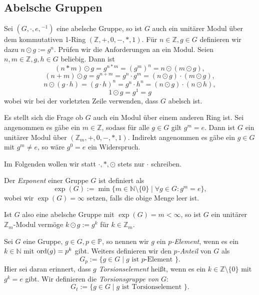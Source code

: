 
\subsection{Abelsche Gruppen}

\begin{remark}
    Sei $(G, \cdot, e, {}^{-1})$ eine abelsche Gruppe, so ist $G$ auch ein unitärer Modul über dem kommutativen 1-Ring $(\mathbb{Z}, +, 0, -, \ast, 1)$. Für $n \in \mathbb{Z}, g \in G$ definieren wir dazu $n \odot g := g^n$. Prüfen wir die Anforderungen an ein Modul. Seien $n, m \in \mathbb{Z}, g, h \in G$ beliebig. Dann ist
    $$ (n \ast m) \odot g = g^{n \ast m} = (g^m)^n = n \odot (m \odot g), $$
    $$ (n+m) \odot g = g^{n+m} = g^n \cdot g^m = (n \odot g) \cdot (m \odot g), $$
    $$ n \odot (g \cdot h) = (g \cdot h)^n = g^n \cdot h^n = (n \odot g) \cdot (n \odot h), $$
    $$1\odot g=g^1=g$$
    wobei wir bei der vorletzten Zeile verwenden, dass $G$ abelsch ist.

    Es stellt sich die Frage ob $G$ auch ein Modul über einem anderen Ring ist. Sei angenommen es gäbe ein $m \in \mathbb{Z}$, sodass für alle $g \in G$ gilt $g^m = e$. Dann ist $G$ ein unitärer Modul über $(\mathbb{Z}_m, +, 0, -, \ast, 1)$. Indirekt angenommen es gäbe ein $g \in G$ mit $g^m \neq e$, so wäre $g^0 = e$ ein Widerspruch.

    Im Folgenden wollen wir statt $\cdot, \ast, \odot$ stets nur $\cdot$ schreiben.
\end{remark}

\begin{definition}
    Der \emph{Exponent} einer Gruppe $G$ ist definiert als
    $$ \exp(G) := \min \{ m \in \mathbb{N} \setminus \{0\} \mid \forall g \in G: g^m = e \}, $$
    wobei wir $\exp(G) = \infty$ setzen, falls die obige Menge leer ist.
\end{definition}

\begin{remark}
    Ist $G$ also eine abelsche Gruppe mit $\exp(G) = m < \infty$, so ist $G$ ein unitärer $\mathbb{Z}_m$-Modul vermöge $k \odot g := g^k$ für $k \in \mathbb{Z}_m$.
\end{remark}

\begin{definition}
    Sei $G$ eine Gruppe, $g \in G, p \in \mathbb{P}$, so nennen wir $g$ ein \emph{$p$-Element}, wenn es ein $k \in \mathbb{N}$ mit $\operatorname{ord}(g) = p^k$ gibt. Weiters definieren wir den \emph{$p$-Anteil} von $G$ als
    $$ G_p := \{ g \in G \mid g \textrm{ ist $p$-Element } \}. $$
    Hier sei daran erinnert, dass $g$ \emph{Torsionselement} heißt, wenn es ein $k \in \mathbb{Z} \setminus \{ 0 \}$ mit $g^k = e$ gibt. Wir definieren die \emph{Torsionsgruppe von $G$}:
    $$ G_t := \{ g \in G \mid g \textrm{ ist Torsionselement } \}. $$
\end{definition}

